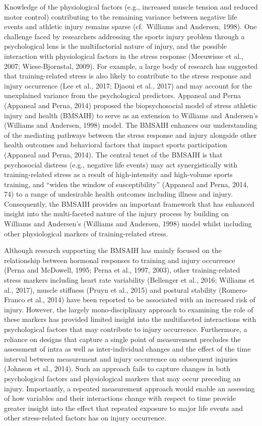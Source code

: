 \documentclass[
]{frontiersHLTH}
\begin{document}
Knowledge of the physiological factors (e.g., increased muscle tension
and reduced motor control) contributing to the remaining variance
between negative life events and athletic injury remains sparse
(cf.~Williams and Andersen, 1998). One challenge faced by researchers
addressing the sports injury problem through a psychological lens is the
multifactorial nature of injury, and the possible interaction with
physiological factors in the stress response (Meeuwisse et al., 2007;
Wiese-Bjornstal, 2009). For example, a large body of research has
suggested that training-related stress is also likely to contribute to
the stress response and injury occurrence (Lee et al., 2017; Djaoui et
al., 2017) and may account for the unexplained variance from the
psychological predictors. Appaneal and Perna (Appaneal and Perna, 2014)
proposed the biopsychosocial model of stress athletic injury and health
(BMSAIH) to serve as an extension to Williams and Andersen's (Williams
and Andersen, 1998) model. The BMSAIH enhances our understanding of the
mediating pathways between the stress response and injury alongside
other health outcomes and behavioral factors that impact sports
participation (Appaneal and Perna, 2014). The central tenet of the
BMSAIH is that psychosocial distress (e.g., negative life events) may
act synergistically with training-related stress as a result of
high-intensity and high-volume sports training, and ``widen the window
of susceptibility'' (Appaneal and Perna, 2014, 74) to a range of
undesirable health outcomes including illness and injury. Consequently,
the BMSAIH provides an important framework that has enhanced insight
into the multi-faceted nature of the injury process by building on
Williams and Andersen's (Williams and Andersen, 1998) model whilst
including other physiological markers of training-related stress.

Although research supporting the BMSAIH has mainly focused on the
relationship between hormonal responses to training and injury
occurrence (Perna and McDowell, 1995; Perna et al., 1997, 2003), other
training-related stress markers including heart rate variability
(Bellenger et al., 2016; Williams et al., 2017), muscle stiffness (Pruyn
et al., 2015) and postural stability (Romero-Franco et al., 2014) have
been reported to be associated with an increased risk of injury.
However, the largely mono-disciplinary approach to examining the role of
these markers has provided limited insight into the multifaceted
interactions with psychological factors that may contribute to injury
occurrence. Furthermore, a reliance on designs that capture a single
point of measurement precludes the assessment of intra as well as
inter-individual changes and the effect of the time interval between
measurement and injury occurrence on subsequent injuries (Johnson et
al., 2014). Such an approach fails to capture changes in both
psychological factors and physiological markers that may occur preceding
an injury. Importantly, a repeated measurement approach would enable an
assessing of how variables and their interactions change with respect to
time provide greater insight into the effect that repeated exposure to
major life events and other stress-related factors has on injury
occurrence.
\end{document}
